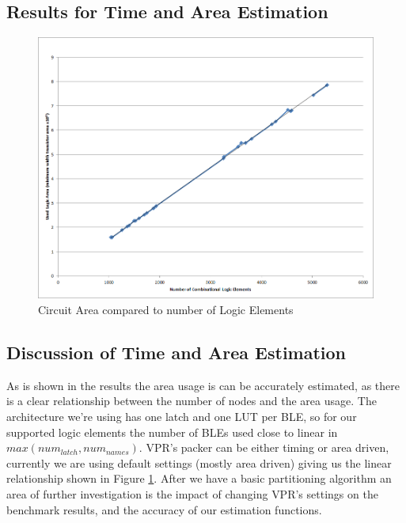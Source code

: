\documentclass[12pt,drafta4paper,oneside]{memoir} %
\begin{document}
{\subsection{Results for Time and Area Estimation}
\begin{figure}
    \includegraphics[width=\textwidth]{images/area-v-elements.png}
    \caption{Circuit Area compared to number of Logic Elements}
    \label{AreaVElements}
\end{figure}
\subsection{Discussion of Time and Area Estimation}
As is shown in the results  the area usage is can be accurately estimated, as there is a clear relationship between the number of nodes and the area usage. The architecture we're using  has one latch and one \ac{LUT} per \ac{BLE}, so for our supported logic elements the number of \acp{BLE} used close to linear in $max(num_{latch}, num_{names})$. \ac{VPR}'s packer can be either timing or area driven, currently we are using default settings (mostly area driven) giving us the linear relationship shown in Figure \ref{AreaVElements}. After we have a basic partitioning algorithm an area of further investigation is the impact of changing \ac{VPR}'s settings on the benchmark results, and the accuracy of our estimation functions.

}
\end{document}
